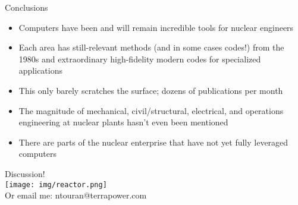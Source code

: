 \documentclass[pdf,aspectratio=169]{beamer}
\newcommand{\backupbegin}{
   \newcounter{finalframe}
   \setcounter{finalframe}{\value{framenumber}}
}
\newcommand{\backupend}{
   \setcounter{framenumber}{\value{finalframe}}
}
\begin{document}
\begin{frame}[plain,c]{Conclusions}
    \begin{itemize}
        \item Computers have been and will remain incredible tools for nuclear engineers
        \item Each area has still-relevant methods (and in some cases codes!) from the 1980s and extraordinary
            high-fidelity modern codes for specialized applications
        \item This only barely scratches the surface; dozens of publications per month
        \item The magnitude of mechanical, civil/structural, electrical, and operations
            engineering at nuclear plants hasn't even been mentioned
        \item There are parts of the nuclear enterprise that have not yet fully leveraged
            computers
    \end{itemize}
	\begin{center}
	\Huge Discussion!\\
    \texttt{[image: img/reactor.png]}\\
    \normalsize Or email me: ntouran@terrapower.com
	\end{center}
\end{frame}
\appendix
\backupbegin




\backupend
\end{document}
